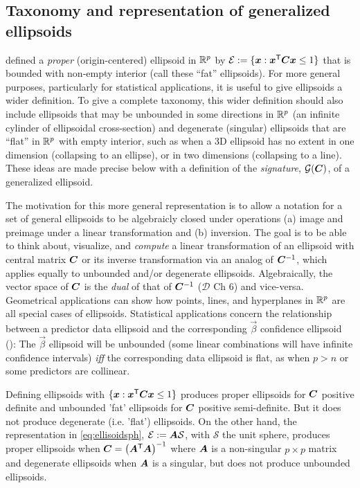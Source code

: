 \subsection{Taxonomy and representation of generalized ellipsoids}\label{sec:taxonomy}
 defined a \emph{proper} (origin-centered) ellipsoid in  $\mathbb{R}^{p}$ by
$\mathcal{E} := \{ \bm{x}: \bm{x}^\mathsf{T} \bm{C} \bm{x} \le 1 \}$ that is bounded with non-empty interior (call these ``fat'' ellipsoids).
For more general purposes, particularly for statistical applications,
it is useful to give ellipsoids a wider definition.
To give a complete taxonomy, this wider definition should also include ellipsoids that may be unbounded in some directions in $\mathbb{R}^{p}$
(an infinite cylinder of ellipsoidal cross-section) and
degenerate (singular) ellipsoids that are ``flat'' in  $\mathbb{R}^{p}$ with empty interior, such as when a 3D ellipsoid has no extent in
one dimension (collapsing to an ellipse), or in two dimensions (collapsing to a line).  These ideas are made precise below
with a definition of the \emph{signature}, $\mathcal{G}(\bm{C})$, of a generalized ellipsoid.

The motivation for this more general representation is to allow a notation for a set of general ellipsoids to be
algebraicly closed under operations (a) image and preimage under a linear transformation and (b) inversion.
The goal is to be able to think about, visualize, and \emph{compute} a linear transformation of an ellipsoid with central matrix
$\bm{C}$ or its inverse transformation via an analog of $\bm{C}^{-1}$, which applies equally to unbounded
and/or degenerate ellipsoids. 
Algebraically, the vector space of $\bm{C}$ is the \emph{dual} of that of $\bm{C}^{-1}$ ($\mathcal{D}$ Ch 6) and vice-versa.
Geometrical applications can show how points, lines, and hyperplanes 
in  $\mathbb{R}^{p}$ are all special cases of ellipsoids.
Statistical applications concern the relationship between a predictor data ellipsoid and the
corresponding $\vec{\beta}$ confidence ellipsoid (): The $\vec{\beta}$ ellipsoid will be unbounded (some linear combinations
will have infinite confidence intervals) \emph{iff} the corresponding data ellipsoid is flat, as when $p>n$ or some predictors are collinear.

Defining ellipsoids with $\{ \bm{x}: \bm{x}^\mathsf{T} \bm{C} \bm{x} \le 1 \}$ produces proper ellipsoids for $\bm{C}$
positive definite and unbounded 'fat' ellipsoids for $\bm{C}$ positive semi-definite.
But it does not produce degenerate (i.e. 'flat') ellipsoids.  On the other hand,
the representation in \eqref{eq:ellisoidsph},
$\mathcal{E} := \bm{A} \mathcal{S}$, with $\mathcal{S}$ the unit sphere,
 produces proper ellipsoids when $\bm{C} = \left( \bm{A} ^\mathsf{T} \bm{A} \right)^{-1}$
where $\bm{A}$ is a non-singular $p \times p$ matrix and degenerate ellipsoids when $\bm{A}$ is a singular, but does not
produce unbounded ellipsoids.

